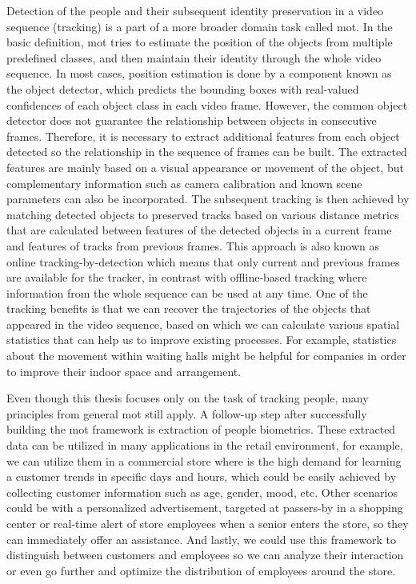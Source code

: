 \begin{introduction}
Detection of the people and their subsequent identity preservation in a video sequence (tracking) is a part of a more broader domain task called \gls{mot}. In the basic definition, \gls{mot} tries to estimate the position of the objects from multiple predefined classes, and then maintain their identity through the whole video sequence. In most cases, position estimation is done by a component known as the object detector, which predicts the bounding boxes with real-valued confidences of each object class in each video frame. However, the common object detector does not guarantee the relationship between objects in consecutive frames. Therefore, it is necessary to extract additional features from each object detected so the relationship in the sequence of frames can be built. The extracted features are mainly based on a visual appearance or movement of the object, but complementary information such as camera calibration and known scene parameters can also be incorporated. The subsequent tracking is then achieved by matching detected objects to preserved tracks based on various distance metrics that are calculated between features of the detected objects in a current frame and features of tracks from previous frames. This approach is also known as online tracking-by-detection which means that only current and previous frames are available for the tracker, in contrast with offline-based tracking where information from the whole sequence can be used at any time. One of the tracking benefits is that we can recover the trajectories of the objects that appeared in the video sequence, based on which we can calculate various spatial statistics that can help us to improve existing processes. For example, statistics about the movement within waiting halls might be helpful for companies in order to improve their indoor space and arrangement. 

Even though this thesis focuses only on the task of tracking people, many principles from general \gls{mot} still apply. A follow-up step after successfully building the \gls{mot} framework is extraction of people biometrics. These extracted data can be utilized in many applications in the retail environment, for example, we can utilize them in a commercial store where is the high demand for learning a customer trends in specific days and hours, which could be easily achieved by collecting customer information such as age, gender, mood, etc. Other scenarios could be with a personalized advertisement, targeted at passers-by in a shopping center or real-time alert of store employees when a senior enters the store, so they can immediately offer an assistance. And lastly, we could use this framework to distinguish between customers and employees so we can analyze their interaction or even go further and optimize the distribution of employees around the store.


\end{introduction}
